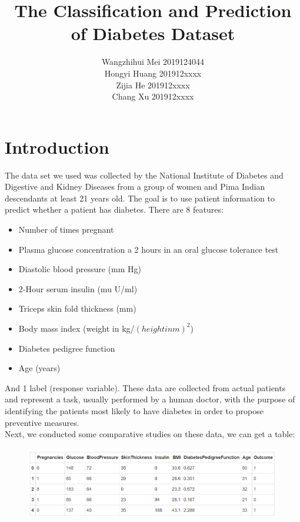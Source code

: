 \documentclass[11pt,en]{elegantpaper}
\title{The Classification and Prediction of Diabetes Dataset}
\author{Wangzhihui Mei 2019124044 \\ Hongyi Huang 201912xxxx \\ Zijia He 201912xxxx \\ Chang Xu 201912xxxx}
\institute{CCNU-UOW JI}
\begin{document}
\maketitle



\section{Introduction}
The data set we used was collected by the 
National Institute of Diabetes and Digestive and Kidney Diseases 
from a group of women and Pima Indian descendants at least 21 years old. The goal is to use patient information to predict whether a patient has diabetes.
There are 8 features:\\
\begin{itemize}
    \item Number of times pregnant
    \item Plasma glucose concentration a 2 hours in an oral glucose tolerance test
    \item Diastolic blood pressure (mm Hg)
    \item 2-Hour serum insulin (mu U/ml)
    \item Triceps skin fold thickness (mm)
    \item Body mass index (weight in kg/$(height in m)^2$)
    \item Diabetes pedigree function
    \item Age (years)
\end{itemize}

And 1 label (response variable). These data are collected from actual patients and represent a task, 
usually performed by a human doctor, with the purpose of identifying the patients most likely to have
diabetes in order to propose preventive measures. \\
Next, we conducted some comparative studies on these data, we can get a table:\\
\begin{figure}[H]
    \centering
    \includegraphics[scale=0.6]{figure/1.PNG}  
\end{figure}
\end{document}
